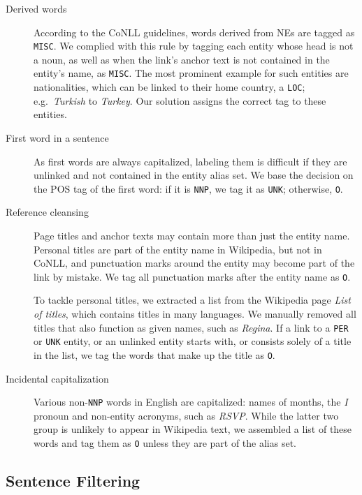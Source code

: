\documentclass[11pt]{article}
\begin{document}

\begin{description}
\item[Derived words] According to the CoNLL guidelines, words derived from NEs are tagged as \texttt{MISC}. We complied with this rule by tagging each entity whose head is not a noun, as well as when the link's anchor text is not contained in the entity's name, as \texttt{MISC}. The most prominent example for such entities are nationalities, which can be linked to their home country, a \texttt{LOC}; e.g.~\textit{Turkish} to \textit{Turkey}. Our solution assigns the correct tag to these entities.
\item[First word in a sentence] As first words are always capitalized, labeling them is difficult if they are unlinked and not contained in the entity alias set. We base the decision on the POS tag of the first word: if it is \texttt{NNP}, we tag it as \texttt{UNK}; otherwise, \texttt{O}.
\item[Reference cleansing] Page titles and anchor texts may contain more than just the entity name. Personal titles are part of the entity name in Wikipedia, but not in CoNLL, and punctuation marks around the entity may become part of the link by mistake. We tag all punctuation marks after the entity name as \texttt{O}.

To tackle personal titles, we extracted a list from the Wikipedia page \textit{List of titles}, which contains titles in many languages. We manually removed all titles that also function as given names, such as \textit{Regina}. If a link to a \texttt{PER} or \texttt{UNK} entity, or an unlinked entity starts with, or consists solely of a title in the list, we tag the words that make up the title as \texttt{O}.
\item[Incidental capitalization] Various non-\texttt{NNP} words in English are capitalized: names of months, the \textit{I} pronoun and non-entity acronyms, such as \textit{RSVP}. While the latter two group is unlikely to appear in Wikipedia text, we assembled a list of these words and tag them as \texttt{O} unless they are part of the alias set.
\end{description}

\subsection{Sentence Filtering}
\end{document}
